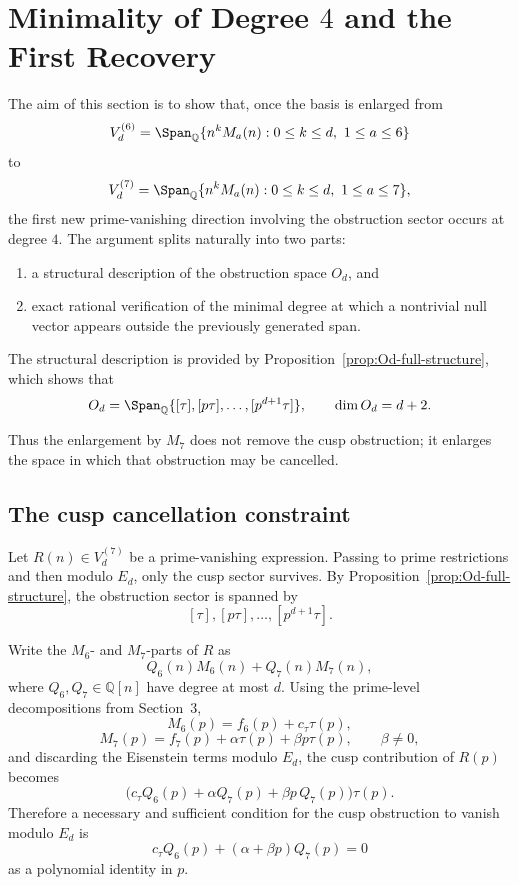 

\section{Minimality of Degree $4$ and the First Recovery}\label{sec:minimality}

The aim of this section is to show that, once the basis is enlarged from
\[
V_d^{(6)}=\Span_{\mathbb Q}\{n^kM_a(n):0\le k\le d,\ 1\le a\le 6\}
\]
to
\[
V_d^{(7)}=\Span_{\mathbb Q}\{n^kM_a(n):0\le k\le d,\ 1\le a\le 7\},
\]
the first new prime-vanishing direction involving the obstruction sector occurs at degree $4$. The argument splits naturally into two parts:

\begin{enumerate}
    \item a structural description of the obstruction space $O_d$, and
    \item exact rational verification of the minimal degree at which a nontrivial null vector appears outside the previously generated span.
\end{enumerate}

The structural description is provided by Proposition~\ref{prop:Od-full-structure}, which shows that
\[
O_d=\Span_{\mathbb Q}\{[\tau],[p\tau],\dots,[p^{d+1}\tau]\},
\qquad
\dim O_d=d+2.
\]

Thus the enlargement by $M_7$ does not remove the cusp obstruction; it enlarges the space in which that obstruction may be cancelled.

\subsection{The cusp cancellation constraint}

Let $R(n)\in V_d^{(7)}$ be a prime-vanishing expression. Passing to prime restrictions and then modulo $E_d$, only the cusp sector survives. By Proposition~\ref{prop:Od-full-structure}, the obstruction sector is spanned by
\[
[\tau],[p\tau],\dots,[p^{d+1}\tau].
\]

Write the $M_6$- and $M_7$-parts of $R$ as
\[
Q_6(n)M_6(n)+Q_7(n)M_7(n),
\]
where $Q_6,Q_7\in\mathbb Q[n]$ have degree at most $d$. Using the prime-level decompositions from Section~3,
\[
M_6(p)=f_6(p)+c_\tau\tau(p),
\]
\[
M_7(p)=f_7(p)+\alpha\tau(p)+\beta p\tau(p),
\qquad \beta\neq 0,
\]
and discarding the Eisenstein terms modulo $E_d$, the cusp contribution of $R(p)$ becomes
\[
\bigl(c_\tau Q_6(p)+\alpha Q_7(p)+\beta p\,Q_7(p)\bigr)\tau(p).
\]
Therefore a necessary and sufficient condition for the cusp obstruction to vanish modulo $E_d$ is
\begin{equation}\label{eq:cusp-constraint}
c_\tau Q_6(p)+(\alpha+\beta p)Q_7(p)=0
\end{equation}
as a polynomial identity in $p$.

